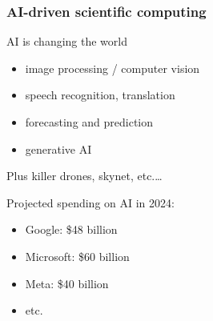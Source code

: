 \documentclass[
    xcolor={svgnames,dvipsnames},
    hyperref={colorlinks, citecolor=DeepPink4, linkcolor=DarkRed, urlcolor=DarkBlue}
    ]{beamer}  %
\newcommand{\1}{\mathbbm 1}
\begin{document}
\begin{frame}
    \frametitle{AI-driven scientific computing}

    AI is changing the world

    \begin{itemize}
        \item image processing / computer vision
        \vspace{0.5em}
        \item speech recognition, translation
        \vspace{0.5em}
        \item forecasting and prediction 
        \vspace{0.5em}
        \item generative AI
    \end{itemize}

    \pause

        \vspace{0.5em}
        \vspace{0.5em}
        \vspace{0.5em}
    Plus killer drones, skynet, etc.\ldots

    
\end{frame}

\begin{frame}
    
    Projected spending on AI in 2024:

    \begin{itemize}
        \item Google: \$48 billion
        \vspace{0.5em}
        \item Microsoft: \$60 billion
        \vspace{0.5em}
        \item Meta: \$40 billion
        \vspace{0.5em}
        \item etc.
    \end{itemize}

\end{frame}
\end{document}
